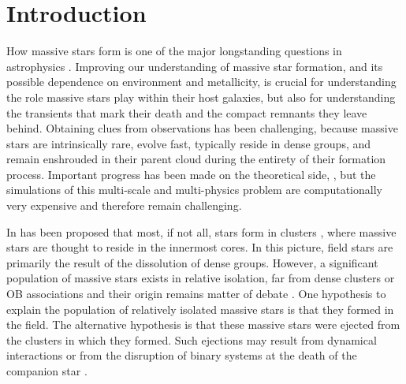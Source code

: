 \documentclass[apjl,twocolumn]{emulateapj}
\begin{document}
\maketitle{}

\section{Introduction}
\label{sec:intro}

How massive stars form is one of the major longstanding questions in astrophysics
\citep[e.g.,][]{zinnecker:07}. Improving our understanding of massive star formation, and its
possible dependence on environment and metallicity, is crucial for understanding the role massive stars play within their host galaxies, but also for understanding the transients that mark their death and the compact remnants they leave behind.
%
Obtaining clues from observations has been challenging, because massive stars are intrinsically rare, 
evolve fast, typically reside in dense groups, and remain enshrouded in
their parent cloud during the entirety of their formation
process. Important progress has been made on the theoretical side,
\citep[e.g.][]{bate:09,kuiper:15,rosen:16}, but the simulations of this multi-scale and multi-physics problem are computationally very expensive and therefore remain challenging.  

In has been proposed that most, if not all, stars form in clusters \citep{lada:03}, where massive stars are thought to reside in the innermost cores. In this picture, field stars are primarily the result of the dissolution of dense groups.  However, a significant population of massive stars exists in relative isolation, far from dense clusters or OB associations and their origin remains matter of debate \citep{gvaramadze:12, lamb:16,ward:18}.   One hypothesis to explain the population of relatively isolated massive stars is that they formed in the field. The alternative hypothesis is that these massive stars were ejected from the clusters in which they formed.  Such ejections may result from dynamical interactions \citep[e.g.,][]{poveda:67} or from the disruption of binary systems at the death of the companion  star \citep[e.g.,][]{zwicky:57, blaauw:61, renzo:18}. 
 
\end{document}
